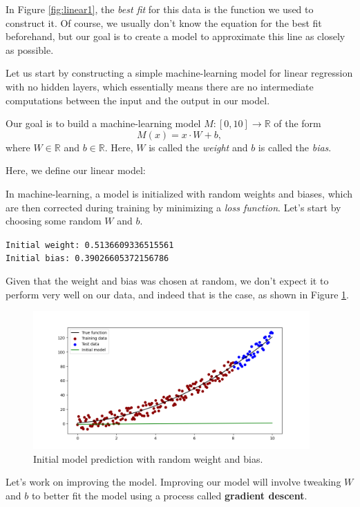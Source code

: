 In Figure \ref{fig:linear1}, the \textit{best fit} for this data is the function we used to construct it. Of course, we usually don't know the equation for the best fit beforehand, but our goal is to create a model to approximate this line as closely as possible. 

Let us start by constructing a simple machine-learning model for linear regression with no hidden layers, which essentially means there are no intermediate computations between the input and the output in our model.

Our goal is to build a machine-learning model 
$M:[0,10]\to\mathbb{R}$ of the form $$M(x) = x\cdot W + b,$$ where $W\in\mathbb{R}$ and $b\in\mathbb{R}$. Here, $W$ is called the \emph{weight} and $b$ is called the \emph{bias}.   

Here, we define our linear model:



In machine-learning, a model is initialized with random weights and biases, which are then corrected during training by minimizing a \emph{loss function}. Let's start by choosing some random $W$ and $b$.


\texttt{\small{Initial weight: 0.5136609336515561\\
Initial bias: 0.39026605372156786
}}

Given that the weight and bias was chosen at random, we don't expect it to perform very well on our data, and indeed that is the case, as shown in Figure \ref{fig:linear2}.

\begin{figure}[h]
    \centering
    \includegraphics[width=300pt]{Regression/code/fig2.png}
    \caption{Initial model prediction with random weight and bias.}
    \label{fig:linear2}
\end{figure}

Let's work on improving the model. Improving our model will involve tweaking $W$ and $b$ to better fit the model using a process called \textbf{gradient descent}.

